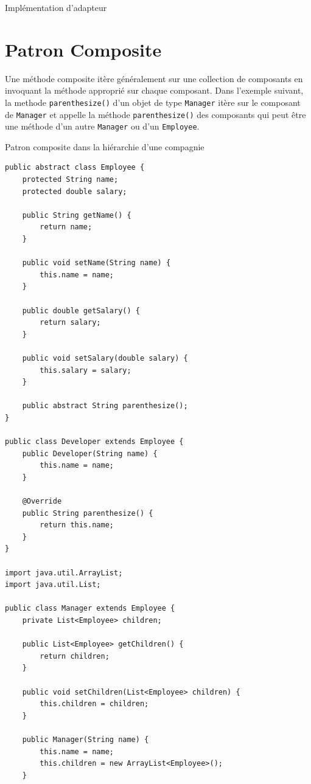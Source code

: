 \documentclass[16pt]{report}
\begin{document}
\begin{multicols*}{2}
\begin{EExample}{Implémentation d'adapteur}{}
        \end{EExample}              

    \section{Patron Composite}
    Une méthode composite itère généralement sur une collection de composants en 
    invoquant la méthode approprié sur chaque composant. Dans l'exemple suivant,  
    la methode \texttt{parenthesize()} d'un objet de type \texttt{Manager} itère 
    sur le \textcolor{myb}{composant} de \texttt{Manager} et appelle la méthode 
    \texttt{parenthesize()} des composants qui peut être une méthode d'un autre 
    \texttt{Manager} ou d'un \texttt{Employee}.     


    \begin{EExample}{Patron composite dans la hiérarchie d'une compagnie}{}
        
\begin{lstlisting}[style=JavaDraculaWhite]
 public abstract class Employee {
    protected String name;
    protected double salary;

    public String getName() {
        return name;
    }

    public void setName(String name) {
        this.name = name;
    }

    public double getSalary() {
        return salary;
    }

    public void setSalary(double salary) {
        this.salary = salary;
    }

    public abstract String parenthesize();
}

public class Developer extends Employee {
    public Developer(String name) {
        this.name = name;
    }

    @Override
    public String parenthesize() {
        return this.name;
    }
}

import java.util.ArrayList;
import java.util.List;

public class Manager extends Employee {
    private List<Employee> children;

    public List<Employee> getChildren() {
        return children;
    }

    public void setChildren(List<Employee> children) {
        this.children = children;
    }

    public Manager(String name) {
        this.name = name;
        this.children = new ArrayList<Employee>();
    }


\end{lstlisting}
\end{EExample}
\end{multicols*}
\end{document}
